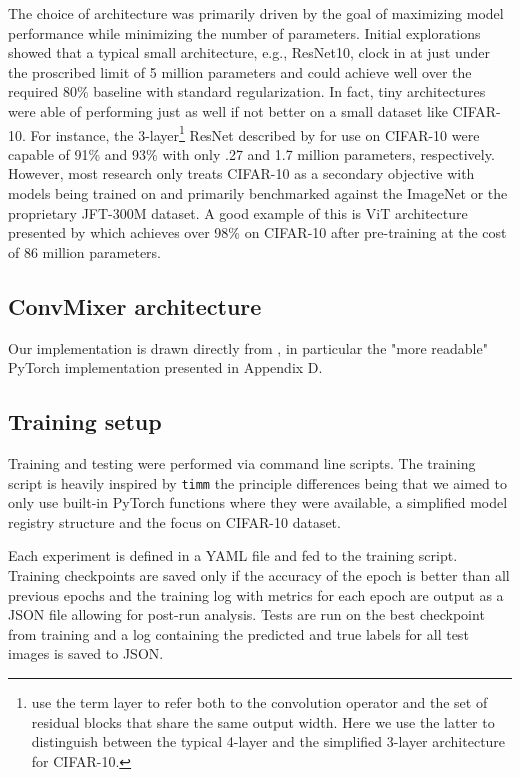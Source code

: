 \documentclass[letterpaper]{article} %
\begin{document}
The choice of architecture was primarily driven by the goal of maximizing model performance while minimizing the number of parameters. Initial explorations showed that a typical small architecture, e.g., ResNet10, clock in at just under the proscribed limit of 5 million parameters and could achieve well over the required 80\% baseline with standard regularization. In fact, tiny architectures were able of performing just as well if not better on a small dataset like CIFAR-10. For instance, the 3-layer\footnote{\citet{He2015} use the term layer to refer both to the convolution operator and the set of residual blocks that share the same output width. Here we use the latter to distinguish between the typical 4-layer and the simplified 3-layer architecture for CIFAR-10.} ResNet described by \citet{He2015} for use on CIFAR-10 were capable of 91\% and 93\% with only .27 and 1.7 million parameters, respectively. However, most research only treats CIFAR-10 as a secondary objective with models being trained on and primarily benchmarked against the ImageNet or the proprietary JFT-300M dataset. A good example of this is ViT architecture presented by \citet{Dosovitskiy2020} which achieves over 98\% on CIFAR-10 after pre-training at the cost of 86 million parameters.


\subsection{ConvMixer architecture}





Our implementation is drawn directly from \citet{trockman2022patches}, in particular the "more readable" PyTorch implementation presented in Appendix D. 

\subsection{Training setup}

Training and testing were performed via command line scripts. The training script is heavily inspired by \verb|timm| \citep{rw2019timm} the principle differences being that we aimed to only use built-in PyTorch functions where they were available, a simplified model registry structure and the focus on CIFAR-10 dataset. 

Each experiment is defined in a YAML file and fed to the training script. Training checkpoints are saved only if the accuracy of the epoch is better than all previous epochs and the training log with metrics for each epoch are output as a JSON file allowing for post-run analysis. Tests are run on the best checkpoint from training and a log containing the predicted and true labels for all test images is saved to JSON.
\end{document}
